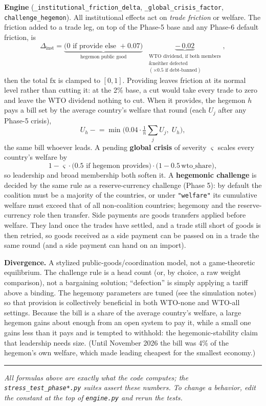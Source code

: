 \documentclass[11pt]{article}
\newcommand{\code}[1]{\texttt{#1}}
\begin{document}
\textbf{Engine} (\code{\_institutional\_friction\_delta}, \code{\_global\_crisis\_factor},
\code{challenge\_hegemon}). All institutional effects act on \emph{trade friction}
or welfare. The friction added to a trade leg, on top of the Phase-5 base and any
Phase-6 default friction, is
\[
\Delta_{\text{inst}} =
\underbrace{\big(0 \text{ if provide else } {+}0.07\big)}_{\text{hegemon public good}}
\;\;\underbrace{-\,0.02}_{\substack{\text{WTO dividend, if both members}\\\text{\& neither defected}\\(\times 0.5 \text{ if debt-banned})}} ,
\]
then the total $\mathrm{fx}$ is clamped to $[0,1]$. Providing leaves friction at
its normal level rather than cutting it: at the 2\% base, a cut would take every
trade to zero and leave the WTO dividend nothing to cut. When it provides, the
hegemon $h$ pays a bill set by the average country's welfare that round (each
$U_j$ after any Phase-5 crisis),
\[
U_h \mathrel{-}= \min\Big(0.04\cdot\tfrac1n \textstyle\sum_j U_j,\; U_h\Big),
\]
the same bill whoever leads. A pending \textbf{global crisis} of
severity $\varsigma$ scales every country's welfare by
\[
1 - \varsigma\cdot\big(0.5 \text{ if hegemon provides}\big)\cdot\big(1 - 0.5\,\text{wto\_share}\big),
\]
so leadership and broad membership both soften it. A \textbf{hegemonic challenge}
is decided by the same rule as a reserve-currency challenge (Phase 5): by default
the coalition must be a majority of the countries, or under \code{"welfare"} its
cumulative welfare must exceed that of all non-coalition countries; hegemony and
the reserve-currency role then transfer.
Side payments are goods transfers applied before welfare. They land once the
trades have settled, and a trade still short of goods is then retried, so goods
received as a side payment can be passed on in a trade the same round (and a
side payment can hand on an import).

\textbf{Divergence.} A stylized public-goods/coordination model, not a
game-theoretic equilibrium. The challenge rule is a head count (or, by choice, a
raw weight comparison), not a bargaining solution; ``defection'' is simply applying a tariff above a binding.
The hegemony parameters are tuned (see the simulation notes) so that provision is
collectively beneficial in both WTO-none and WTO-all settings. Because the bill is a
share of the average country's welfare, a large hegemon gains about enough from an
open system to pay it, while a small one gains less than it pays and is tempted to
withhold: the hegemonic-stability claim that leadership needs size. (Until
November 2026 the bill was 4\% of the hegemon's own welfare, which made leading
cheapest for the smallest economy.)

\vspace{8pt}
\noindent\rule{\textwidth}{0.4pt}
\textit{All formulas above are exactly what the code computes; the
\code{stress\_test\_phase*.py} suites assert these numbers. To change a behavior,
edit the constant at the top of \code{engine.py} and rerun the tests.}
\end{document}
